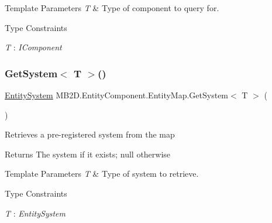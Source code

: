 \begin{DoxyTemplParams}{Template Parameters}
{\em T} & Type of component to query for.\\
\hline
\end{DoxyTemplParams}
\begin{Desc}
\item[Type Constraints]\begin{description}
\item[{\em T} : {\em I\+Component}]\end{description}
\end{Desc}
\hypertarget{class_m_b2_d_1_1_entity_component_1_1_entity_map_a1240739b3c9be7daeebd2a0ae3cc04ff}{}\label{class_m_b2_d_1_1_entity_component_1_1_entity_map_a1240739b3c9be7daeebd2a0ae3cc04ff} 
\subsubsection{\texorpdfstring{Get\+System$<$ T $>$()}{GetSystem< T >()}}
{\footnotesize\ttfamily \hyperlink{class_m_b2_d_1_1_entity_component_1_1_entity_system}{Entity\+System} M\+B2\+D.\+Entity\+Component.\+Entity\+Map.\+Get\+System$<$ T $>$ (\begin{DoxyParamCaption}{ }\end{DoxyParamCaption})\hspace{0.3cm}{\ttfamily [inline]}}



Retrieves a pre-\/registered system from the map 

\begin{DoxyReturn}{Returns}
The system if it exists; null otherwise
\end{DoxyReturn}

\begin{DoxyTemplParams}{Template Parameters}
{\em T} & Type of system to retrieve.\\
\hline
\end{DoxyTemplParams}
\begin{Desc}
\item[Type Constraints]\begin{description}
\item[{\em T} : {\em Entity\+System}]\end{description}
\end{Desc}
\hypertarget{class_m_b2_d_1_1_entity_component_1_1_entity_map_a968ce46cbba14cdc7814dd308f133949}{}\label{class_m_b2_d_1_1_entity_component_1_1_entity_map_a968ce46cbba14cdc7814dd308f133949} 
